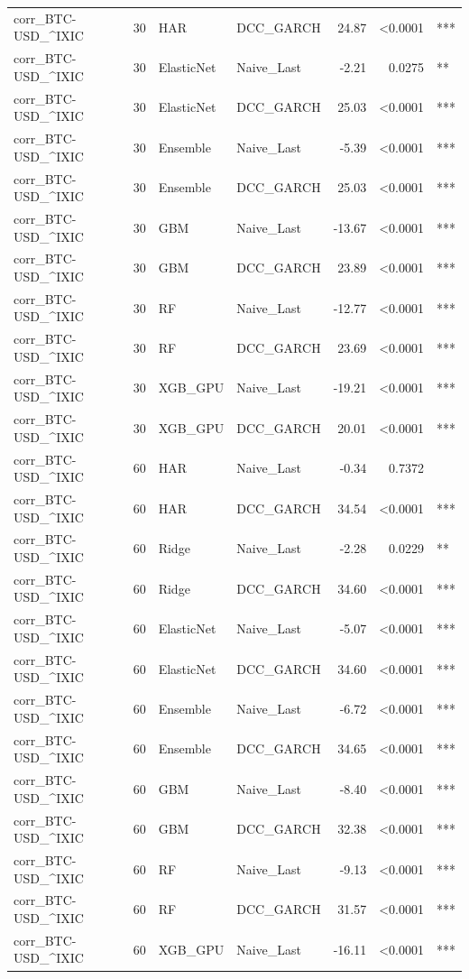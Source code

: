 \begin{table}[H]
\begin{tabular}{llllrrl}
corr_BTC-USD_^IXIC & 30 & HAR & DCC_GARCH & 24.87 & <0.0001 & *** \\
corr_BTC-USD_^IXIC & 30 & ElasticNet & Naive_Last & -2.21 & 0.0275 & ** \\
corr_BTC-USD_^IXIC & 30 & ElasticNet & DCC_GARCH & 25.03 & <0.0001 & *** \\
corr_BTC-USD_^IXIC & 30 & Ensemble & Naive_Last & -5.39 & <0.0001 & *** \\
corr_BTC-USD_^IXIC & 30 & Ensemble & DCC_GARCH & 25.03 & <0.0001 & *** \\
corr_BTC-USD_^IXIC & 30 & GBM & Naive_Last & -13.67 & <0.0001 & *** \\
corr_BTC-USD_^IXIC & 30 & GBM & DCC_GARCH & 23.89 & <0.0001 & *** \\
corr_BTC-USD_^IXIC & 30 & RF & Naive_Last & -12.77 & <0.0001 & *** \\
corr_BTC-USD_^IXIC & 30 & RF & DCC_GARCH & 23.69 & <0.0001 & *** \\
corr_BTC-USD_^IXIC & 30 & XGB_GPU & Naive_Last & -19.21 & <0.0001 & *** \\
corr_BTC-USD_^IXIC & 30 & XGB_GPU & DCC_GARCH & 20.01 & <0.0001 & *** \\
corr_BTC-USD_^IXIC & 60 & HAR & Naive_Last & -0.34 & 0.7372 &  \\
corr_BTC-USD_^IXIC & 60 & HAR & DCC_GARCH & 34.54 & <0.0001 & *** \\
corr_BTC-USD_^IXIC & 60 & Ridge & Naive_Last & -2.28 & 0.0229 & ** \\
corr_BTC-USD_^IXIC & 60 & Ridge & DCC_GARCH & 34.60 & <0.0001 & *** \\
corr_BTC-USD_^IXIC & 60 & ElasticNet & Naive_Last & -5.07 & <0.0001 & *** \\
corr_BTC-USD_^IXIC & 60 & ElasticNet & DCC_GARCH & 34.60 & <0.0001 & *** \\
corr_BTC-USD_^IXIC & 60 & Ensemble & Naive_Last & -6.72 & <0.0001 & *** \\
corr_BTC-USD_^IXIC & 60 & Ensemble & DCC_GARCH & 34.65 & <0.0001 & *** \\
corr_BTC-USD_^IXIC & 60 & GBM & Naive_Last & -8.40 & <0.0001 & *** \\
corr_BTC-USD_^IXIC & 60 & GBM & DCC_GARCH & 32.38 & <0.0001 & *** \\
corr_BTC-USD_^IXIC & 60 & RF & Naive_Last & -9.13 & <0.0001 & *** \\
corr_BTC-USD_^IXIC & 60 & RF & DCC_GARCH & 31.57 & <0.0001 & *** \\
corr_BTC-USD_^IXIC & 60 & XGB_GPU & Naive_Last & -16.11 & <0.0001 & *** \\

\end{tabular}
\end{table}

